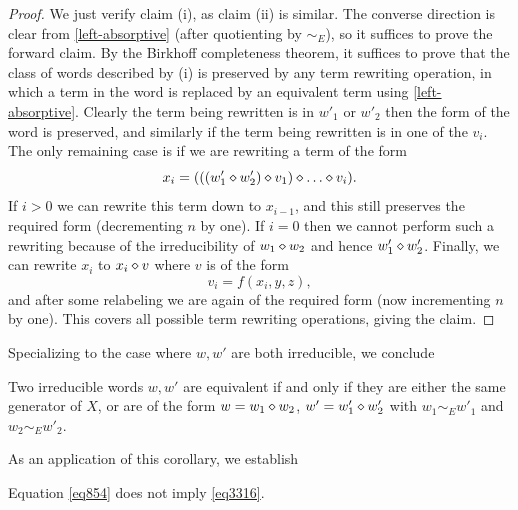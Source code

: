 \begin{proof}  We just verify claim (i), as claim (ii) is similar.  The converse direction is clear from \eqref{left-absorptive} (after quotienting by $\sim_E$), so it suffices to prove the forward claim. By the Birkhoff completeness theorem, it suffices to prove that the class of words described by (i) is preserved by any term rewriting operation, in which a term in the word is replaced by an equivalent term using \eqref{left-absorptive}.  Clearly the term being rewritten is in $w'_1$ or $w'_2$ then the form of the word is preserved, and similarly if the term being rewritten is in one of the $v_i$.  The only remaining case is if we are rewriting a term of the form
$$ x_i = (((w'_1 \op w'_2) \op v_1) \op \dots \op v_i).$$
If $i>0$ we can rewrite this term down to $x_{i-1}$, and this still preserves the required form (decrementing $n$ by one).  If $i=0$ then we cannot perform such a rewriting because of the irreducibility of $w_1 \diamond w_2$ and hence $w'_1 \diamond w'_2$.  Finally, we can rewrite $x_i$ to $x_i \diamond v$ where $v$ is of the form
$$ v_i = f(x_i,y,z),$$
and after some relabeling we are again of the required form (now incrementing $n$ by one). This covers all possible term rewriting operations, giving the claim.
\end{proof}

Specializing to the case where $w,w'$ are both irreducible, we conclude

\begin{corollary}\label{unique-factorization}  Two irreducible words $w, w'$ are equivalent if and only if they are either the same generator of $X$, or are of the form $w = w_1 \diamond w_2$, $w' = w'_1 \diamond w'_2$ with $w_1 \sim_E w'_1$ and $w_2 \sim_E w'_2$.
\end{corollary}

As an application of this corollary, we establish

\begin{proposition}\label{854-3316} Equation \eqref{eq854} does not imply \eqref{eq3316}.
\end{proposition}

